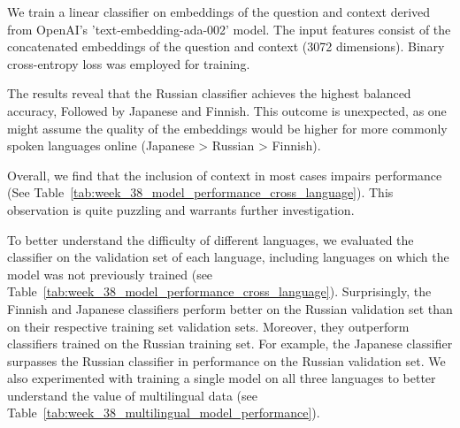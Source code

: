 \documentclass[11pt]{article}
\begin{document}
We train a linear classifier on embeddings of the question and context derived from OpenAI's 'text-embedding-ada-002' model. 
The input features consist of the concatenated embeddings of the question and context (3072 dimensions). 
Binary cross-entropy loss was employed for training.

\begin{table}[ht]
    \centering
    \caption{Model performance for language-specific training and cross-language evaluation, with and without context}
    \label{tab:model_performance_cross_language}
\end{table}

The results reveal that the Russian classifier achieves the highest balanced accuracy, Followed by Japanese and Finnish.
This outcome is unexpected, as one might assume the quality of the embeddings would be higher for more commonly spoken languages online (Japanese > Russian > Finnish). 

Overall, we find that the inclusion of context in most cases impairs performance (See Table~\ref{tab:week_38_model_performance_cross_language}). This observation is quite puzzling and warrants further investigation.

To better understand the difficulty of different languages, we evaluated the classifier on the validation set of each language, including languages on which the model was not previously trained (see Table~\ref{tab:week_38_model_performance_cross_language}).
Surprisingly, the Finnish and Japanese classifiers perform better on the Russian validation set than on their respective training set validation sets. Moreover, they outperform classifiers trained on the Russian training set.
For example, the Japanese classifier surpasses the Russian classifier in performance on the Russian validation set.
We also experimented with training a single model on all three languages to better understand the value of multilingual data (see Table~\ref{tab:week_38_multilingual_model_performance}).
\end{document}
